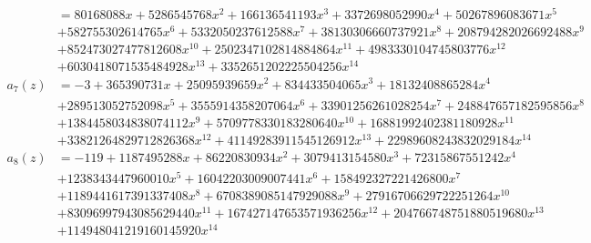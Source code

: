 \documentclass[reqno]{amsart}
\theoremstyle{definition}
\theoremstyle{remark}
\numberwithin{equation}{section}
\begin{document}
\begin{align*}
&= 80168088 x + 5286545768 x^2 + 166136541193 x^3 + 3372698052990 x^4 + 50267896083671 x^5\\ 
&+ 582755302614765 x^6 + 5332050237612588 x^7 + 38130306660737921 x^8 + 208794282026692488 x^9\\
&+ 852473027477812608 x^{10} + 2502347102814884864 x^{11} + 4983330104745803776 x^{12}\\ 
&+ 6030418071535484928 x^{13} + 3352651202225504256 x^{14}\\
a_7(z)
&= -3 + 365390731 x + 25095939659 x^2 + 834433504065 x^3 + 18132408865284 x^4\\ 
&+ 289513052752098 x^5 + 3555914358207064 x^6 + 33901256261028254 x^7 + 248847657182595856 x^8\\
&+ 1384458034838074112 x^9 + 5709778330183280640 x^{10} + 16881992402381180928 x^{11}\\
&+ 33821264829712826368 x^{12} + 41149283911545126912 x^{13} + 22989608243832029184 x^{14}\\
a_8(z)
&=-119 + 1187495288 x + 86220830934 x^2 + 3079413154580 x^3 + 72315867551242 x^4\\ 
&+ 1238343447960010 x^5 + 16042203009007441 x^6 + 158492327221426800 x^7\\ 
&+ 1189441617391337408 x^8 + 6708389085147929088 x^9 + 27916706629722251264 x^{10}\\ 
&+ 83096997943085629440 x^{11} + 167427147653571936256 x^{12} + 204766748751880519680 x^{13}\\
&+ 114948041219160145920 x^{14}
\end{align*}
\end{document}
